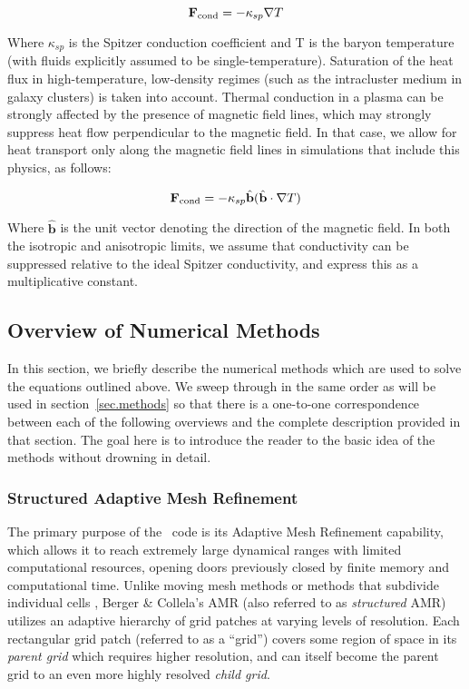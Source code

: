\begin{equation}
\fcond = -\kappa_{sp} \nabla T
\end{equation}

Where $\kappa_{sp}$ is the Spitzer conduction coefficient
\citep{1962pfig.book.....S} and T is the baryon temperature (with
fluids explicitly assumed to be single-temperature).  Saturation of the heat flux in
high-temperature, low-density regimes (such as the intracluster medium
in galaxy clusters) is taken into account.  Thermal conduction in a
plasma can be strongly affected by the presence of magnetic field
lines, which may strongly suppress heat flow perpendicular to the
magnetic field.  In that case, we allow for heat transport only along
the magnetic field lines in simulations that include this physics, as follows:

\begin{equation}
\fcond= -\kappa_{sp} \hat{\textbf{b}} (\hat{\textbf{b}} \cdot \nabla T)
\end{equation}

Where $\hat{\textbf{b}}$ is the unit vector denoting the direction of the
magnetic field.  In both the isotropic and anisotropic limits, we
assume that conductivity can be suppressed relative to the ideal
Spitzer conductivity, and express this as a multiplicative constant.


\subsection{Overview of Numerical Methods}

In this section, we briefly describe the numerical methods which are used to solve the equations outlined above.  We sweep through in the same order as will be used in section~\ref{sec.methods} so that there is a one-to-one correspondence between each of the following overviews and the complete description provided in that section.  The goal here is to introduce the reader to the basic idea of the methods without drowning in detail.

\subsubsection{Structured Adaptive Mesh Refinement}

The primary purpose of the \enzo\ code is its Adaptive Mesh Refinement
capability, which allows it to reach extremely large dynamical ranges
with limited computational resources, opening doors previously closed
by finite memory and computational time. Unlike moving mesh methods
\citep{1995ApJS..100..269P,1995ApJS...97..231G} or  
methods that subdivide 
individual cells \citep{Adjerid}, Berger \& Collela's AMR (also referred 
to as \emph{structured} AMR) utilizes an adaptive hierarchy of grid 
patches at varying levels of resolution.  Each rectangular grid patch 
(referred to as a ``grid'') covers some region of space in its 
\emph{parent grid} which requires higher resolution, and can itself 
become the parent grid to an even more highly resolved \emph{child grid}. 


